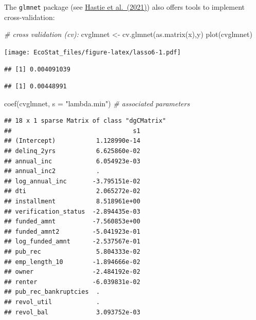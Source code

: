 \documentclass[
  12pt,
]{book}
\newenvironment{Shaded}{\begin{snugshade}}{\end{snugshade}}
\newcommand{\AttributeTok}[1]{\textcolor[rgb]{0.77,0.63,0.00}{#1}}
\newcommand{\CommentTok}[1]{\textcolor[rgb]{0.56,0.35,0.01}{\textit{#1}}}
\newcommand{\FloatTok}[1]{\textcolor[rgb]{0.00,0.00,0.81}{#1}}
\newcommand{\FunctionTok}[1]{\textcolor[rgb]{0.00,0.00,0.00}{#1}}
\newcommand{\NormalTok}[1]{#1}
\newcommand{\OtherTok}[1]{\textcolor[rgb]{0.56,0.35,0.01}{#1}}
\newcommand{\SpecialCharTok}[1]{\textcolor[rgb]{0.00,0.00,0.00}{#1}}
\newcommand{\StringTok}[1]{\textcolor[rgb]{0.31,0.60,0.02}{#1}}
\theoremstyle{definition}
\theoremstyle{definition}
\theoremstyle{definition}
\theoremstyle{definition}
\theoremstyle{remark}
\begin{document}
The \texttt{glmnet} package (see \href{https://glmnet.stanford.edu/articles/glmnet.html}{Hastie et al.~(2021)}) also offers tools to implement cross-validation:

\begin{Shaded}
\begin{Highlighting}[]
\CommentTok{\# cross validation (cv):}
\NormalTok{cvglmnet }\OtherTok{\textless{}{-}} \FunctionTok{cv.glmnet}\NormalTok{(}\FunctionTok{as.matrix}\NormalTok{(x),y)}
\FunctionTok{plot}\NormalTok{(cvglmnet)}
\end{Highlighting}
\end{Shaded}

\texttt{[image: EcoStat\_files/figure-latex/lasso6-1.pdf]}

\begin{Shaded}
\end{Shaded}

\begin{verbatim}
## [1] 0.004091039
\end{verbatim}

\begin{Shaded}
\end{Shaded}

\begin{verbatim}
## [1] 0.00448991
\end{verbatim}

\begin{Shaded}
\begin{Highlighting}[]
\FunctionTok{coef}\NormalTok{(cvglmnet, }\AttributeTok{s =} \StringTok{"lambda.min"}\NormalTok{) }\CommentTok{\# associated parameters}
\end{Highlighting}
\end{Shaded}

\begin{verbatim}
## 18 x 1 sparse Matrix of class "dgCMatrix"
##                                 s1
## (Intercept)           1.128990e-14
## delinq_2yrs           6.625860e-02
## annual_inc            6.054923e-03
## annual_inc2           .           
## log_annual_inc       -3.795151e-02
## dti                   2.065272e-02
## installment           8.518961e+00
## verification_status  -2.894435e-03
## funded_amnt          -7.560853e+00
## funded_amnt2         -5.041923e-01
## log_funded_amnt      -2.537567e-01
## pub_rec               5.804333e-02
## emp_length_10        -1.894666e-02
## owner                -2.484192e-02
## renter               -6.039831e-02
## pub_rec_bankruptcies  .           
## revol_util            .           
## revol_bal             3.093752e-03
\end{verbatim}
\end{document}
